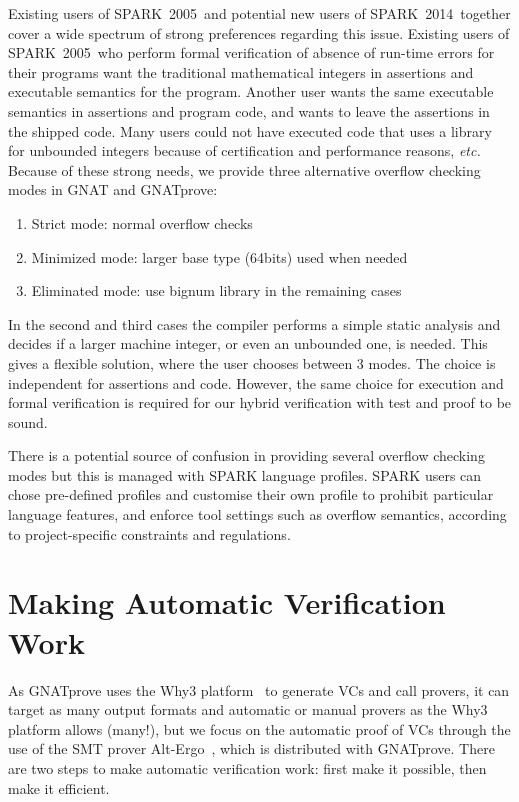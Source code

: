 \documentclass[sttt,final]{svjour}
\newcommand{\gnatprove}{GNATprove\xspace}
\newcommand{\oldspark}{SPARK~2005\xspace}
\newcommand{\newspark}{SPARK~2014\xspace}
\newcommand{\etc}{\textit{etc.}\xspace}
\begin{document}
Existing users of \oldspark\ and potential new users of \newspark\
together cover a wide spectrum of strong preferences regarding this
issue. Existing users of \oldspark\ who perform formal verification of
absence of run-time errors for their programs want the traditional
mathematical integers in assertions and executable semantics for the
program. Another user wants the same executable semantics in
assertions and program code, and wants to leave the assertions in the
shipped code. Many users could not have executed code that uses a
library for unbounded integers because of certification and
performance reasons, \etc Because of these strong needs, we provide
three alternative overflow checking modes in GNAT and \gnatprove:
\begin{enumerate}
\item Strict mode: normal overflow checks
\item Minimized mode: larger base type (64bits) used when needed
\item Eliminated mode: use bignum library in the remaining cases
\end{enumerate}
In the second and third cases the compiler performs a simple static
analysis and decides if a larger machine integer, or even an unbounded
one, is needed. This gives a flexible solution, where the user chooses
between 3 modes. The choice is independent for assertions and
code. However, the same choice for execution and formal verification
is required for our hybrid verification with test and proof to be
sound.

There is a potential source of confusion in providing several overflow
checking modes but this is managed with SPARK language profiles. SPARK
users can chose pre-defined profiles and customise their own profile
to prohibit particular language features, and enforce tool settings
such as overflow semantics, according to project-specific constraints
and regulations.

\section{Making Automatic Verification Work}
\label{automation}

As \gnatprove uses the Why3 platform~\cite{why3} to generate VCs and
call provers, it can target as many output formats and automatic or
manual provers as the Why3 platform allows (many!), but we focus on
the automatic proof of VCs through the use of the SMT prover
Alt-Ergo~\cite{altergo}, which is distributed with \gnatprove. There
are two steps to make automatic verification work: first make it
possible, then make it efficient.
\end{document}
